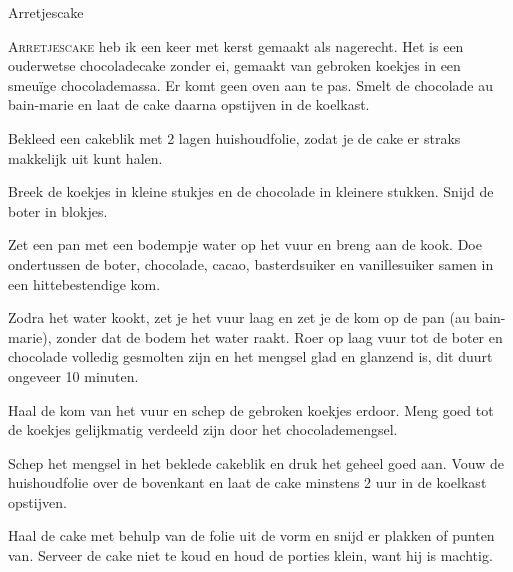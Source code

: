 \begin{recipe}{Arretjescake}


\lettrine{A}{rretjescake} heb ik een keer met kerst gemaakt als nagerecht. Het
is een ouderwetse chocoladecake zonder ei, gemaakt van gebroken koekjes in een
smeuïge chocolademassa. Er komt geen oven aan te pas. Smelt de chocolade au
bain-marie en laat de cake daarna opstijven in de koelkast.

\begin{ingredients}
\end{ingredients}

\begin{steps}
  \item Bekleed een cakeblik met 2 lagen huishoudfolie, zodat je de cake er straks
        makkelijk uit kunt halen.
  \item Breek de koekjes in kleine stukjes en de chocolade in kleinere stukken.
        Snijd de boter in blokjes.
  \item Zet een pan met een bodempje water op het vuur en breng aan de kook. Doe
        ondertussen de boter, chocolade, cacao, basterdsuiker en vanillesuiker samen
        in een hittebestendige kom.
  \item Zodra het water kookt, zet je het vuur laag en zet je de kom op de pan
        (au bain-marie), zonder dat de bodem het water raakt. Roer op laag vuur tot
        de boter en chocolade volledig gesmolten zijn en het mengsel glad en
        glanzend is, dit duurt ongeveer 10 minuten.
  \item Haal de kom van het vuur en schep de gebroken koekjes erdoor. Meng goed tot
        de koekjes gelijkmatig verdeeld zijn door het chocolademengsel.
  \item Schep het mengsel in het beklede cakeblik en druk het geheel goed aan. Vouw
        de huishoudfolie over de bovenkant en laat de cake minstens 2 uur in de
        koelkast opstijven.
  \item Haal de cake met behulp van de folie uit de vorm en snijd er plakken of
        punten van. Serveer de cake niet te koud en houd de porties klein, want hij
        is machtig.
\end{steps}

\end{recipe}
